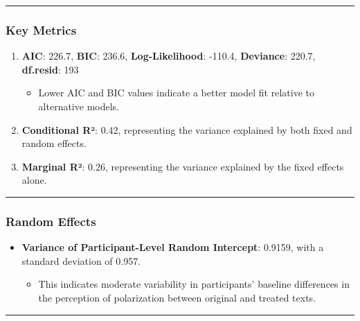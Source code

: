 \documentclass[
]{article}
\providecommand{\tightlist}{%
  \setlength{\itemsep}{0pt}\setlength{\parskip}{0pt}}
\begin{document}
\begin{center}\rule{0.5\linewidth}{0.5pt}\end{center}

\subsubsection{\texorpdfstring{\textbf{Key
Metrics}}{Key Metrics}}\label{key-metrics-1}

\begin{enumerate}
\def\labelenumi{\arabic{enumi}.}
\tightlist
\item
  \textbf{AIC}: 226.7, \textbf{BIC}: 236.6, \textbf{Log-Likelihood}:
  -110.4, \textbf{Deviance}: 220.7, \textbf{df.resid}: 193

  \begin{itemize}
  \tightlist
  \item
    Lower AIC and BIC values indicate a better model fit relative to
    alternative models.
  \end{itemize}
\item
  \textbf{Conditional R²}: 0.42, representing the variance explained by
  both fixed and random effects.
\item
  \textbf{Marginal R²}: 0.26, representing the variance explained by the
  fixed effects alone.
\end{enumerate}

\begin{center}\rule{0.5\linewidth}{0.5pt}\end{center}

\subsubsection{\texorpdfstring{\textbf{Random
Effects}}{Random Effects}}\label{random-effects-1}

\begin{itemize}
\tightlist
\item
  \textbf{Variance of Participant-Level Random Intercept}: 0.9159, with
  a standard deviation of 0.957.

  \begin{itemize}
  \tightlist
  \item
    This indicates moderate variability in participants' baseline
    differences in the perception of polarization between original and
    treated texts.
  \end{itemize}
\end{itemize}

\begin{center}\rule{0.5\linewidth}{0.5pt}\end{center}
\end{document}
